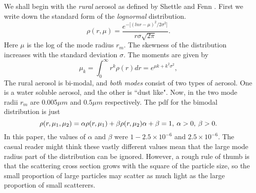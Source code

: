 \documentclass[12pt]{article}
\begin{document}
We shall begin with the {\it rural} aerosol as defined by Shettle and Fenn \cite{ShettleFenn2:Mybib}. First we write down
the standard form of the {\it lognormal} distribution.
\begin{equation}
\rho(r,\mu)=\frac{ e^{-\lbrack (ln r-\mu)^2/2 \sigma^2 \rbrack} }{ r \sigma \sqrt{2 \pi}}.
\end{equation}
Here $\mu$ is the log of the mode radius $r_m$. The skewness of the distribution
 increases with the standard deviation $\sigma$.
The moments are given by
\begin{equation}
\mu_k= \int_0^\infty r^k \rho(r) dr=e^{\mu k +k^2 \sigma^2},
\end{equation}
The rural aerosol is bi-modal, and {\it both modes} consist of two types of aerosol. One is a water
soluble aerosol, and the other is ``dust like".
 Now, in \cite{ShettleFenn2:Mybib} the two mode radii $r_m$ are 0.005$\mu m$
and $0.5 \mu m$ respectively. The pdf for the bimodal distribution is just
\begin{equation}
\rho(r,\mu_1, \mu_2)=\alpha \rho(r, \mu_1)+\beta \rho(r, \mu_2)
$$   $$
\alpha+\beta=1, \> \alpha >0,  \> \beta >0.
\end{equation}
In this paper, the values of $\alpha$ and $\beta$ were $1-2.5 \times 10^{-6}$ and $2.5 \times 10^{-6}$.
The casual reader might think these vastly different values mean that the large mode radius part
of the distribution can be ignored. However, a rough rule of thumb is that the scattering cross
section grows with the square of the particle size, so the small proportion of large particles may 
scatter as much light as the large proportion of small scatterers.
\end{document}
